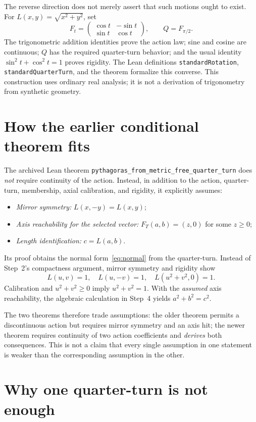 \documentclass[11pt,a4paper]{article}
\begin{document}
The reverse direction does not merely assert that such
motions ought to exist. For
$L(x,y)=\sqrt{x^2+y^2}$, set
\[
 F_t=\begin{pmatrix}
 \cos t&-\sin t\\
 \sin t& \cos t
 \end{pmatrix},\qquad Q=F_{\pi/2}.
\]
The trigonometric addition identities prove the action law;
sine and cosine are continuous; $Q$ has the required
quarter-turn behavior; and the usual identity
$\sin^2t+\cos^2t=1$ proves rigidity.
The Lean definitions \texttt{standardRotation},
\texttt{standardQuarterTurn}, and the theorem
formalize this converse. This construction uses ordinary real
analysis; it is not a derivation of trigonometry from synthetic
geometry.

\section{How the earlier conditional theorem fits}

The archived Lean theorem
\texttt{pythagoras\_from\_metric\_free\_quarter\_turn}
does \emph{not} require continuity of the action.
Instead, in addition to the action, quarter-turn,
membership, axial calibration, and rigidity,
it explicitly assumes:
\begin{itemize}
 \item \emph{Mirror symmetry:} $L(x,-y)=L(x,y)$;
 \item \emph{Axis reachability for the selected vector:}
       $F_T(a,b)=(z,0)$ for some $z\ge0$;
 \item \emph{Length identification:} $c=L(a,b)$.
\end{itemize}
Its proof obtains the normal form~\eqref{eq:normal}
from the quarter-turn. Instead of Step~2's compactness
argument, mirror symmetry and rigidity show
\[
 L(u,v)=1,\quad L(u,-v)=1,\quad
 L(u^2+v^2,0)=1.
\]
Calibration and $u^2+v^2\ge0$ imply
$u^2+v^2=1$. With the \emph{assumed} axis
reachability, the algebraic calculation in Step~4 yields
$a^2+b^2=c^2$.

The two theorems therefore trade assumptions:
the older theorem permits a discontinuous action but
requires mirror symmetry and an axis hit; the newer
theorem requires continuity of two action coefficients
and \emph{derives} both consequences. This is not a claim
that every single assumption in one statement is weaker
than the corresponding assumption in the other.

\section{Why one quarter-turn is not enough}
\end{document}
